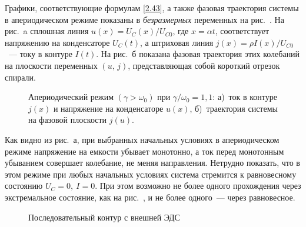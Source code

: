 Графики, соответствующие формулам \eqref{2.43}, а также фазовая траектория
системы в апериодическом режиме показаны в \emph{безразмерных} переменных на
рис.~. На рис.~a сплошная линия
$u(x)=U_C(x)/U_{C0}$, где $x=\alpha t$, соответствует напряжению на конденсаторе
$U_C(t)$, а штриховая линия $j(x)=\rho I(x)/U_{C0}$~--- току в контуре $I(t)$.
На рис.~б показана фазовая траектория этих колебаний на плоскости
переменных $(u,\,j)$, представляющая собой
короткий отрезок спирали.

\begin{figure}[h]
	\begin{minipage}[h]{0.49\linewidth}
		\centering\small
	\end{minipage}
	\hfill
	\begin{minipage}[h]{0.49\linewidth}
		\centering\small
	\end{minipage}
	\caption{Апериодический режим $(\gamma>\omega_0)$ при
$\gamma/\omega_0=1,1$: а)~ток в контуре $j(x)$ и напряжение на 
конденсаторе $u(x)$, б)~траектория системы на фазовой плоскости $j(u)$.}
\end{figure}

Как видно из рис.~а, 
при выбранных начальных условиях в апериодическом режиме напряжение на емкости 
убывает монотонно, а ток перед монотонным убыванием
совершает колебание, не меняя направления. Нетрудно показать, что в этом режиме при
любых начальных условиях система стремится к равновесному состоянию
$U_C=0,~I=0$. При этом возможно не более одного прохождения через экстремальное
состояние, как на рис.~, и не более одного~--- через равновесное.

\label{sec:forced}

\label{sec:complex}

\begin{wrapfigure}[11]{o}{0.27\textwidth}
    \centering\small
    \caption{Последовательный контур с внешней ЭДС}
\end{wrapfigure}

